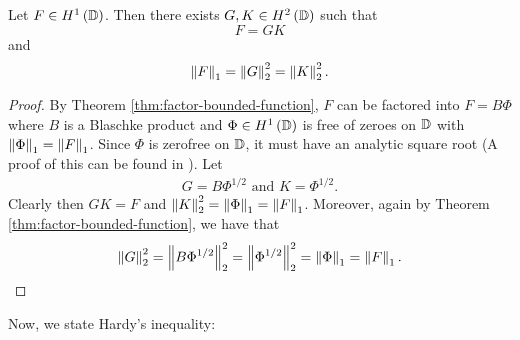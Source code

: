 \begin{theorem}
    Let $F \in H^{1} \left( \mathbb D \right)$. Then there exists $G, K \in H^{2} \left( \mathbb D \right)$ such that
    \begin{equation*}
	F=GK
    \end{equation*}
    and
    \begin{equation*}
	\left\lVert F \right\rVert_{1} = \left\lVert G \right\rVert_{2} ^{2} = \left\lVert K \right\rVert_{2} ^{2}.
    \end{equation*}
    \label{lem:h1-factored-h2}
\end{theorem}
\begin{proof}
    By Theorem \ref{thm:factor-bounded-function}, $F$ can be factored into $F=B \Phi$ where $B$ is a Blaschke product and $\Phi \in H^{1} \left( \mathbb D \right)$ is free of zeroes on $\mathbb D$ with $\left\lVert \Phi \right\rVert_{1} = \left\lVert F \right\rVert_{1}$. Since $\Phi$ is zerofree on $\mathbb D$, it must have an analytic square root (A proof of this can be found in \cite{ash2014complex}). Let 
    \begin{align*}
	G=B\Phi ^{1/2} \text{ and } K= \Phi ^{1/2}.
    \end{align*}
    Clearly then $GK=F$ and $\left\lVert K \right\rVert_{2}^{2} = \left\lVert \Phi \right\rVert_{1} = \left\lVert F \right\rVert_{1}$. Moreover, again by Theorem \ref{thm:factor-bounded-function}, we have that
    \begin{equation*}
	\left\lVert G \right\rVert_{2}^{2} = \left\lVert B\Phi ^{1/2} \right\rVert_{2} ^{2} = \left\lVert \Phi ^{1/2} \right\rVert_{2}^{2} = \left\lVert \Phi \right\rVert_{1} = \left\lVert F \right\rVert_{1}.
    \end{equation*}
\end{proof}

Now, we state Hardy's inequality:

